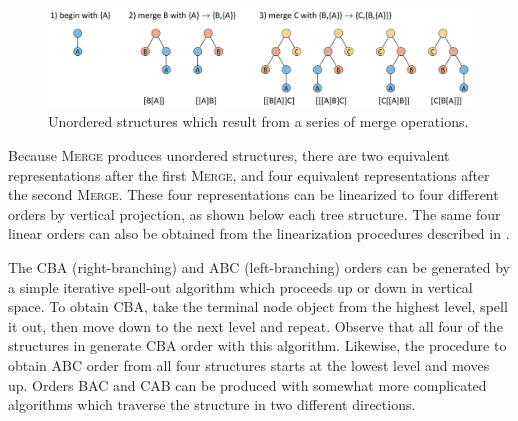   
\begin{figure}
\includegraphics[width=\textwidth]{figures/Tilsen-img42.png}
\caption{Unordered structures which result from a series of merge operations.}
\label{fig:3:14}
\end{figure}
 

  Because \textsc{Merge} produces unordered structures, there are two equivalent representations after the first \textsc{Merge}, and four equivalent representations after the second \textsc{Merge}. These four representations can be linearized to four different orders by vertical projection, as shown below each tree structure. The same four linear orders can also be obtained from the linearization procedures described in {}.

  The CBA (right-branching) and ABC (left-branching) orders can be generated by a simple iterative spell-out algorithm which proceeds up or down in vertical space. To obtain CBA, take the terminal node object from the highest level, spell it out, then move down to the next level and repeat. Observe that all four of the structures in {} generate CBA order with this algorithm. Likewise, the procedure to obtain ABC order from all four structures starts at the lowest level and moves up. Orders BAC and CAB can be produced with somewhat more complicated algorithms which traverse the structure in two different directions.

